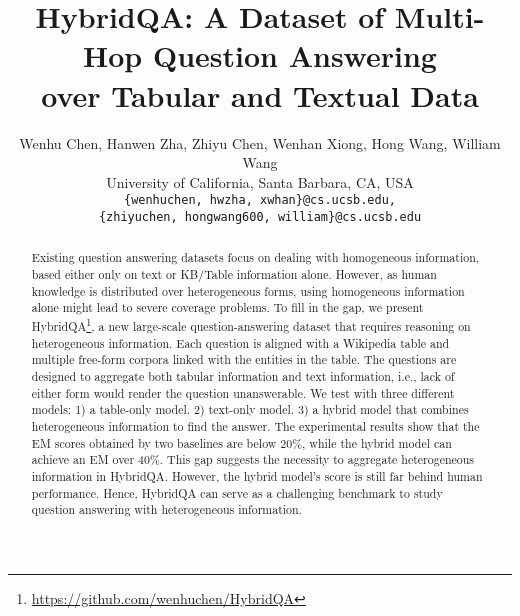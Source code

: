 \documentclass[11pt,a4paper]{article}
\title{HybridQA: A Dataset of Multi-Hop Question Answering \\over Tabular and Textual Data}
\author{Wenhu Chen, Hanwen Zha, Zhiyu Chen, Wenhan Xiong, Hong Wang, William Wang\\
University of California, Santa Barbara, CA, USA\\
\tt{\{wenhuchen, hwzha, xwhan\}@cs.ucsb.edu,}\\
\tt{\{zhiyuchen, hongwang600, william\}@cs.ucsb.edu}\\
}
\date{}
\begin{document}
\maketitle
\begin{abstract}
Existing question answering datasets focus on dealing with homogeneous information, based either only on text or KB/Table information alone. However, as human knowledge is distributed over heterogeneous forms, using homogeneous information alone might lead to severe coverage problems. To fill in the gap, we present HybridQA\footnote{\url{https://github.com/wenhuchen/HybridQA}}, a new large-scale question-answering dataset that requires reasoning on heterogeneous information. Each question is aligned with a Wikipedia table and multiple free-form corpora linked with the entities in the table. The questions are designed to aggregate both tabular information and text information, i.e., lack of either form would render the question unanswerable. We test with three different models: 1) a table-only model. 2) text-only model. 3) a hybrid model that combines heterogeneous information to find the answer. The experimental results show that the EM scores obtained by two baselines are below 20\%, while the hybrid model can achieve an EM over 40\%. This gap suggests the necessity to aggregate heterogeneous information in HybridQA. However, the hybrid model's score is still far behind human performance. Hence, HybridQA can serve as a challenging benchmark to study question answering with heterogeneous information. 
\end{abstract}
\end{document}

